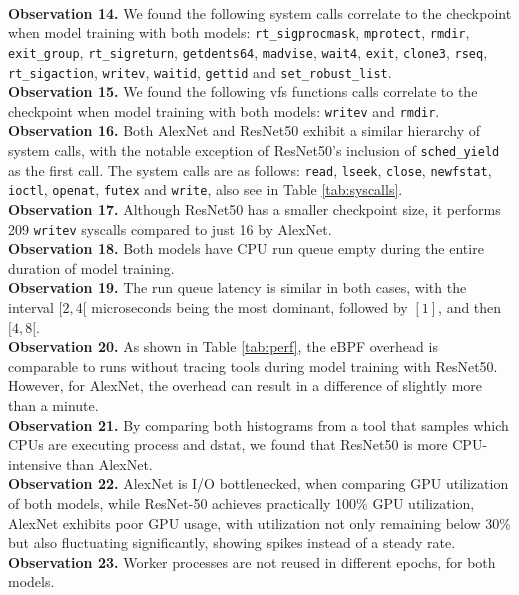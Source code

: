 \documentclass[conference]{IEEEtran}
\begin{document}
\\
\textbf{Observation 14.} We found the following system calls correlate to the checkpoint when model training with both models: \texttt{rt\_sigprocmask}, \texttt{mprotect}, \texttt{rmdir}, \texttt{exit\_group}, \texttt{rt\_sigreturn}, \texttt{getdents64}, \texttt{madvise}, \texttt{wait4}, \texttt{exit}, \texttt{clone3}, \texttt{rseq}, \texttt{rt\_sigaction}, \texttt{writev}, \texttt{waitid}, \texttt{gettid} and \texttt{set\_robust\_list}.
\\
\textbf{Observation 15.} We found the following vfs functions calls correlate to the checkpoint when model training with both models: \texttt{writev} and \texttt{rmdir}.
\\
\textbf{Observation 16.} Both AlexNet and ResNet50 exhibit a similar hierarchy of system calls, with the notable exception of ResNet50's inclusion of \texttt{sched\_yield} as the first call. The system calls are as follows: \texttt{read}, \texttt{lseek}, \texttt{close}, \texttt{newfstat}, \texttt{ioctl}, \texttt{openat}, \texttt{futex} and \texttt{write}, also see in Table \ref{tab:syscalls}.
\\
\textbf{Observation 17.} Although ResNet50 has a smaller checkpoint size, it performs 209 \texttt{writev} syscalls compared to just 16 by AlexNet.
\\
\textbf{Observation 18.} Both models have CPU run queue empty during the entire duration of model training.
\\
\textbf{Observation 19.} The run queue latency is similar in both cases, with the interval \([2, 4[\) microseconds being the most dominant, followed by \([1]\), and then \([4, 8[\).
\\
\textbf{Observation 20.} As shown in Table \ref{tab:perf}, the eBPF overhead is comparable to runs without tracing tools during model training with ResNet50. However, for AlexNet, the overhead can result in a difference of slightly more than a minute.
\\
\textbf{Observation 21.} By comparing both histograms from a tool that samples which CPUs are executing process and dstat, we found that ResNet50 is more CPU-intensive than AlexNet.
\\
\textbf{Observation 22.} AlexNet is I/O bottlenecked, when comparing GPU utilization of both models, while ResNet-50 achieves practically 100\% GPU utilization, AlexNet exhibits poor GPU usage, with utilization not only remaining below 30\% but also fluctuating significantly, showing spikes instead of a steady rate. 
\\
\textbf{Observation 23.} Worker processes are not reused in different epochs, for both models.
\end{document}
